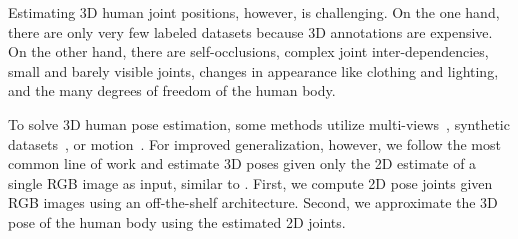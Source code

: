 \documentclass[runningheads]{llncs}
\begin{document}
Estimating 3D human joint positions, however, is  challenging. On the one hand, there are only very few labeled datasets because 3D annotations are expensive. On the other hand, there are self-occlusions, complex joint inter-dependencies, small and barely visible joints, changes in appearance like clothing and lighting, and the many degrees of freedom of the human body.

To solve 3D human pose estimation, some methods utilize multi-views~\cite{rhodin2018unsupervised, zhang2021adafuse}, synthetic datasets~\cite{peng2018jointly}, or motion~\cite{li2021lifting, shere2021temporally}.  For improved generalization, however, we follow the most common line of work and estimate 3D poses given only the 2D estimate of a single RGB image as input, similar to \cite{martinez2017simple, liu2020comprehensive, pavllo20193d}.
First, we compute 2D pose joints given RGB images using an off-the-shelf architecture. Second, we approximate the 3D pose of the human body using the estimated 2D joints.
\end{document}
